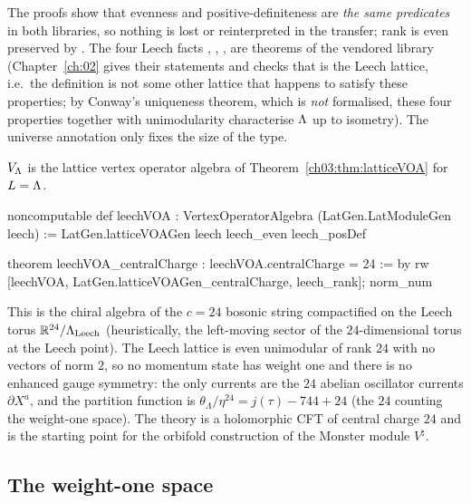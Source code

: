 \begin{dictionary}
The proofs  show that evenness and positive-definiteness are \emph{the same
predicates} in both libraries, so nothing is lost or reinterpreted in the transfer; rank is even
preserved by . The four Leech facts ,
, ,  are
theorems of the vendored library (Chapter~\ref{ch:02} gives their statements and checks that
 is the Leech lattice, i.e.\ the definition is not some other lattice that
happens to satisfy these properties; by Conway's uniqueness theorem, which is \emph{not}
formalised, these four properties together with unimodularity characterise ${\Lambda}$ up to
isometry). The universe annotation  only fixes the size of the type.
\end{dictionary}

\begin{definition}\label{ch03:def:leechVOA}
$V_{\Lambda}$ is the lattice vertex operator algebra of Theorem~\ref{ch03:thm:latticeVOA} for
$L={\Lambda}$.
\end{definition}
\begin{leancode}
noncomputable def leechVOA : VertexOperatorAlgebra (LatGen.LatModuleGen leech) :=
  LatGen.latticeVOAGen leech leech_even leech_posDef

theorem leechVOA_centralCharge : leechVOA.centralCharge = 24 := by
  rw [leechVOA, LatGen.latticeVOAGen_centralCharge, leech_rank]; norm_num
\end{leancode}

\begin{physics}
This is the chiral algebra of the $c=24$ bosonic string compactified on the Leech torus $\mathbb R^{24}/\Lambda_{\rm Leech}$ (heuristically, the left-moving sector of the $24$-dimensional torus at the Leech point). The Leech lattice is even unimodular of rank $24$ with no vectors of norm $2$, so no momentum state has weight one and there is no enhanced gauge symmetry: the only currents are the $24$ abelian oscillator currents $\partial X^a$, and the partition function is $\theta_\Lambda/\eta^{24}=j(\tau)-744+24$ (the $24$ counting the weight-one space). The theory is a holomorphic CFT of central charge $24$ and is the starting point for the orbifold construction of the Monster module $V^\natural$.
\end{physics}

\subsection{The weight-one space}

